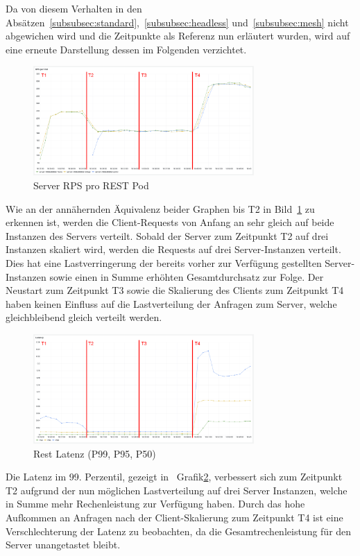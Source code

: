 Da von diesem Verhalten in den Absätzen~\ref{subsubsec:standard},~\ref{subsubsec:headless} und~\ref{subsubsec:mesh} nicht abgewichen wird und die Zeitpunkte als Referenz nun erläutert wurden, wird auf eine erneute Darstellung dessen im Folgenden verzichtet.

\begin{figure}[H]
    \centering
    \includegraphics[width=0.75\textwidth]{img/rest_rps}
    \caption{Server RPS pro REST Pod}
    \label{fig:rest_rps}
\end{figure}

Wie an der annähernden Äquivalenz beider Graphen bis T2 in Bild~\ref{fig:rest_rps} zu erkennen ist, werden die Client-Requests von Anfang an sehr gleich auf beide Instanzen des Servers verteilt.
Sobald der Server zum Zeitpunkt T2 auf drei Instanzen skaliert wird, werden die Requests auf drei Server-Instanzen verteilt.
Dies hat eine Lastverringerung der bereits vorher zur Verfügung gestellten Server-Instanzen sowie einen in Summe erhöhten Gesamtdurchsatz zur Folge.
Der Neustart zum Zeitpunkt T3 sowie die Skalierung des Clients zum Zeitpunkt T4 haben keinen Einfluss auf die Lastverteilung der Anfragen zum Server, welche gleichbleibend gleich verteilt werden.

\begin{figure}[H]
    \centering
    \includegraphics[width=0.75\textwidth]{img/rest_latenz}
    \caption{Rest Latenz (P99, P95, P50)}
    \label{fig:rest_latenz}
\end{figure}

Die Latenz im 99. Perzentil, gezeigt in~ Grafik\ref{fig:rest_latenz}, verbessert sich zum Zeitpunkt T2 aufgrund der nun möglichen Lastverteilung auf drei Server Instanzen, welche in Summe mehr Rechenleistung zur Verfügung haben.
Durch das hohe Aufkommen an Anfragen nach der Client-Skalierung zum Zeitpunkt T4 ist eine Verschlechterung der Latenz zu beobachten, da die Gesamtrechenleistung für den Server unangetastet bleibt.

